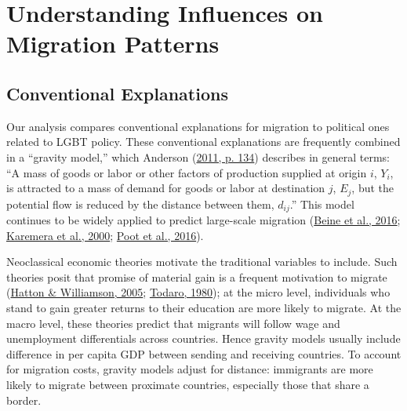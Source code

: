 \documentclass[
  11pt,
]{article}
\begin{document}
\hypertarget{understanding-influences-on-migration-patterns}{%
\section{Understanding Influences on Migration Patterns}\label{understanding-influences-on-migration-patterns}}

\hypertarget{conventional-explanations}{%
\subsection{Conventional Explanations}\label{conventional-explanations}}

Our analysis compares conventional explanations for migration to political ones related to LGBT policy. These conventional explanations are frequently combined in a ``gravity model,'' which Anderson (\protect\hyperlink{ref-anderson_2011}{2011, p. 134}) describes in general terms: ``A mass of goods or labor or other factors of production supplied at origin \(i\), \(Y_i\), is attracted to a mass of demand for goods or labor at destination \(j\), \(E_j\), but the potential flow is reduced by the distance between them, \(d_{ij}\).'' This model continues to be widely applied to predict large-scale migration (\protect\hyperlink{ref-beine_2016}{Beine et al., 2016}; \protect\hyperlink{ref-karemera_2000}{Karemera et al., 2000}; \protect\hyperlink{ref-poot_2016}{Poot et al., 2016}).

Neoclassical economic theories motivate the traditional variables to include. Such theories posit that promise of material gain is a frequent motivation to migrate (\protect\hyperlink{ref-hatton_2005a}{Hatton \& Williamson, 2005}; \protect\hyperlink{ref-todaro_1980}{Todaro, 1980}); at the micro level, individuals who stand to gain greater returns to their education are more likely to migrate. At the macro level, these theories predict that migrants will follow wage and unemployment differentials across countries. Hence gravity models usually include difference in per capita GDP between sending and receiving countries. To account for migration costs, gravity models adjust for distance: immigrants are more likely to migrate between proximate countries, especially those that share a border.
\end{document}
